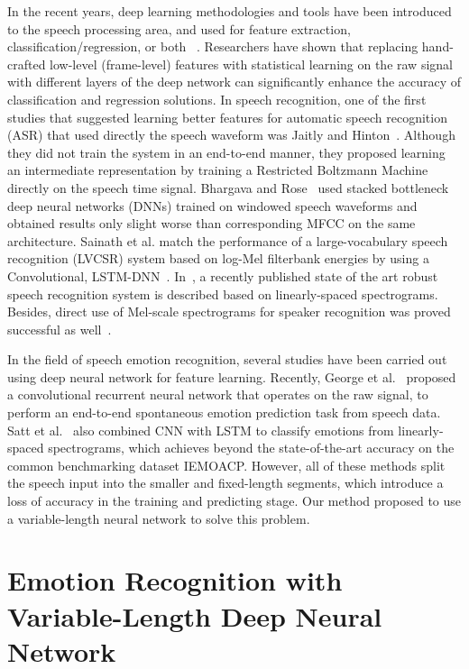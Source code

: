 \documentclass[a4paper]{article}
\begin{document}
In the recent years, deep learning methodologies and tools have been introduced to the speech processing area, and used for feature extraction, classification/regression, or both ~\cite{han2014, lee2015, huang2014, le2013, rana2016, chernykh2017}. Researchers have shown that replacing hand-crafted low-level (frame-level) features with statistical learning on the raw signal with different layers of the deep network can significantly enhance the accuracy of classification and regression solutions. In speech recognition, one of the first studies that suggested learning better features for automatic speech recognition (ASR) that used directly the speech waveform was Jaitly and Hinton~\cite{jaitly2012}. Although they did not train the system in an end-to-end manner, they proposed learning an intermediate representation by training a Restricted Boltzmann Machine directly on the speech time signal. Bhargava and Rose~\cite{bhargava2015} used stacked bottleneck deep neural networks (DNNs) trained on windowed speech waveforms and obtained results only slight worse than corresponding MFCC on the same architecture. Sainath et al. match the performance of a large-vocabulary speech recognition (LVCSR) system based on log-Mel filterbank energies by using a Convolutional, LSTM-DNN~\cite{sainath2015a, sainath2015b}. In~\cite{hannun2014, amodei2015}, a recently published state of the art robust speech recognition system is described based on linearly-spaced spectrograms. Besides, direct use of Mel-scale spectrograms for speaker recognition was proved successful as well~\cite{variani2014}.

In the field of speech emotion recognition, several studies have been carried out using deep neural network for feature learning. Recently, George et al.~\cite{trigeorgis2016} proposed a convolutional recurrent neural network that operates on the raw signal, to perform an end-to-end spontaneous emotion prediction task from speech data. Satt et al.~\cite{satt2017} also combined CNN with LSTM to classify emotions from linearly-spaced spectrograms, which achieves beyond the state-of-the-art accuracy on the common benchmarking dataset IEMOACP. However, all of these methods split the speech input into the smaller and fixed-length segments, which introduce a loss of accuracy in the training and predicting stage. Our method proposed to use a variable-length neural network to solve this problem.

\section{Emotion Recognition with Variable-Length Deep Neural Network}
\label{sec:var_len_vs_fixed_len}
\end{document}
